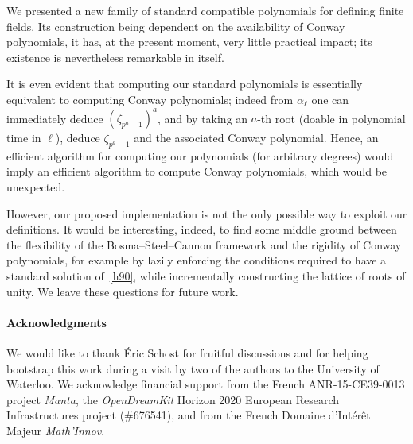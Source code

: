 \documentclass[sigconf]{acmart}
\begin{document}
We presented a new family of standard compatible polynomials for
defining finite fields. %
Its construction being dependent on the availability of Conway
polynomials, it has, at the present moment, very little practical
impact; its existence is nevertheless remarkable in itself.

It is even evident that computing our standard polynomials is
essentially equivalent to computing Conway polynomials; indeed from
$\alpha_\ell$ one can immediately deduce $(\zeta_{p^a-1})^a$, and by
taking an $a$-th root (doable in polynomial time in $\ell$), deduce
$\zeta_{p^a-1}$ and the associated Conway polynomial. %
Hence, an efficient algorithm for computing our polynomials (for
arbitrary degrees) would imply an efficient algorithm to compute
Conway polynomials, which would be unexpected.

However, our proposed implementation is not the only possible way to
exploit our definitions. %
It would be interesting, indeed, to find some middle ground between
the flexibility of the Bosma--Steel--Cannon framework and the rigidity
of Conway polynomials, for example by lazily enforcing the conditions
required to have a standard solution of~\eqref{h90}, while
incrementally constructing the lattice of roots of unity. %
We leave these questions for future work.


\paragraph{Acknowledgments}
We would like to thank \'Eric Schost for fruitful discussions and for
helping bootstrap this work during a visit by two of the authors to
the University of Waterloo. %
We acknowledge financial support from the French ANR-15-CE39-0013
project \emph{Manta}, the \emph{OpenDreamKit} Horizon 2020 European
Research Infrastructures project (\#676541), and from the French
Domaine d'Int\'er\^et Majeur \emph{Math'Innov}.



\end{document}

